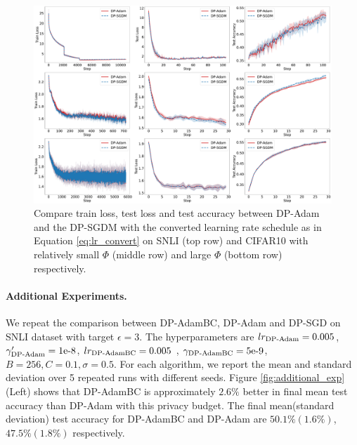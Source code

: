 \documentclass[letterpaper]{article} %
\begin{document}
\begin{figure}[tb]
\centering
\includegraphics[width=0.7\linewidth]{figs/exp_appendix_sgdm_story_error_bars3.pdf}
\caption{Compare train loss, test loss and test accuracy between DP-Adam and the DP-SGDM with the converted learning rate schedule as in Equation \ref{eq:lr_convert} on SNLI (top row) and CIFAR10 with relatively small $\Phi$ (middle row) and large $\Phi$ (bottom row) respectively.
}
\label{fig:exp_rel_sgdm_more}
\end{figure}

\paragraph{Additional Experiments.}
\label{apdix:additional_exp}
We repeat the comparison between DP-AdamBC, DP-Adam and DP-SGD on SNLI dataset with target $\epsilon=3$. The hyperparameters are $lr_{\textnormal{DP-Adam}} = 0.005$, $\gamma'_{\textnormal{DP-Adam}} = 1\textnormal{e-8}$, $lr_{\textnormal{DP-AdamBC}} = 0.005$ , $\gamma_{\textnormal{DP-AdamBC}} = 5\textnormal{e-9}$, $B=256, C=0.1, \sigma=0.5$. For each algorithm, we report the mean and standard deviation over 5 repeated runs with different seeds. Figure \ref{fig:additional_exp}(Left) shows that DP-AdamBC is approximately $2.6\%$ better in final mean test accuracy than DP-Adam with this privacy budget. The final mean(standard deviation) test accuracy for DP-AdamBC and DP-Adam are $50.1\%(1.6\%)$, $47.5\%(1.8\%)$ respectively.
\end{document}
